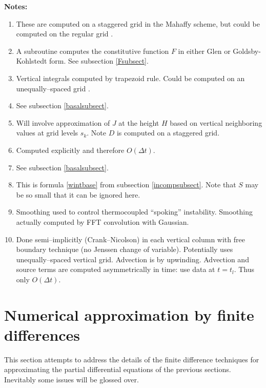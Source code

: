 \documentclass[12pt,final]{amsart}%
\theoremstyle{plain}
\theoremstyle{definition}
\theoremstyle{remark}
\begin{document}
\medskip
\noindent\textbf{Notes:}
\begin{enumerate}
\item\label{stagnote}  These are computed on a staggered grid in the Mahaffy \citep{Mahaffy} scheme, but could be computed on the regular grid \citep{HindmarshPayne}.
\item\label{Fnote} A subroutine computes the constitutive function $F$ in either Glen or Goldsby-Kohlstedt form.  See subsection \ref{Fsubsect}.
\item\label{vertintnote} Vertical integrals computed by trapezoid rule.  Could be computed on an unequally--spaced grid \citep{PayneDongelmans}.
\item\label{basalnote} See subsection \ref{basalsubsect}.
\item\label{interpnote} Will involve approximation of $J$ at the height $H$ based on vertical neighboring values at grid levels $s_k$.  Note $D$ is computed on a staggered grid.
\item\label{hfirstnote} Computed explicitly and therefore $O(\Delta t)$.
\item\label{Snote} See subsection \ref{basalsubsect}.
\item\label{wbasenote} This is formula \eqref{wintbase} from subsection \ref{incompsubsect}.  Note that $S$ may be so small that it can be ignored here.
\item\label{smoothnote} Smoothing used to control thermocoupled ``spoking'' instability.  Smoothing actually computed by FFT convolution with Gaussian.
\item\label{Tnote} Done semi--implicitly (Crank--Nicolson) in each vertical column with free boundary technique (no Jenssen change of variable).  Potentially uses unequally--spaced vertical grid.  Advection is by upwinding.  Advection and source terms are computed asymmetrically in time: use data at $t=t_l$.  Thus only $O(\Delta t)$.
\end{enumerate}


\newpage
\section{Numerical approximation by finite differences}\label{numsect}

This section attempts to address the details of the finite difference techniques for approximating the partial differential equations of the previous sections.  Inevitably some issues will be glossed over.
\end{document}
